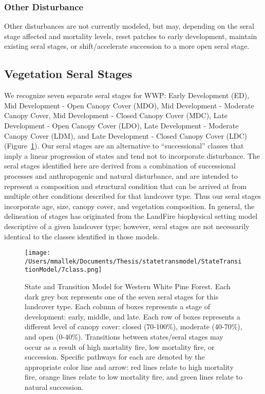 \subsubsection{Other Disturbance}
Other disturbances are not currently modeled, but may, depending on the seral stage affected and mortality levels, reset patches to early development, maintain existing seral stages, or shift/accelerate succession to a more open seral stage. 

\subsection*{Vegetation Seral Stages}
We recognize seven separate seral stages for WWP: Early Development (ED), Mid Development - Open Canopy Cover (MDO), Mid Development - Moderate Canopy Cover, Mid Development - Closed Canopy Cover (MDC), Late Development - Open Canopy Cover (LDO), Late Development - Moderate Canopy Cover (LDM), and Late Development - Closed Canopy Cover (LDC) (Figure~\ref{transmodel_wwp}). Our seral stages are an alternative to ``successional'' classes that imply a linear progression of states and tend not to incorporate disturbance. The seral stages identified here are derived from a combination of successional processes and anthropogenic and natural disturbance, and are intended to represent a composition and structural condition that can be arrived at from multiple other conditions described for that landcover type. Thus our seral stages incorporate age, size, canopy cover, and vegetation composition. In general, the delineation of stages has originated from the LandFire biophysical setting model descriptive of a given landcover type; however, seral stages are not necessarily identical to the classes identified in those models.


\begin{figure}[hbp]
\centering
\texttt{[image: /Users/mmallek/Documents/Thesis/statetransmodel/StateTransitionModel/7class.png]}
\caption{State and Transition Model for Western White Pine Forest. Each dark grey box represents one of the seven seral stages for this landcover type. Each column of boxes represents a stage of development: early, middle, and late. Each row of boxes represents a different level of canopy cover: closed (70-100\%), moderate (40-70\%), and open (0-40\%). Transitions between states/seral stages may occur as a result of high mortality fire, low mortality fire, or succession. Specific pathways for each are denoted by the appropriate color line and arrow: red lines relate to high mortality fire, orange lines relate to low mortality fire, and green lines relate to natural succession.} 
\label{transmodel_wwp}
\end{figure}

